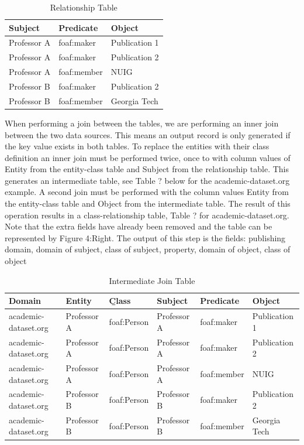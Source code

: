 \documentclass[11pt,onecolumn]{article}
\begin{document}
\begin{table}[h!]
\begin{center}
  \begin{tabular}{| l | l | l | }
    \hline
    {\bf Subject} & {\bf Predicate} & {\bf Object} \\ \hline    
    Professor A & foaf:maker & Publication 1  \\ \hline
    Professor A & foaf:maker & Publication 2  \\ \hline
    Professor A & foaf:member & NUIG  \\ \hline
    Professor B & foaf:maker & Publication 2  \\ \hline
    Professor B & foaf:member & Georgia Tech  \\ \hline
  \end{tabular}
\end{center}
\caption{Relationship Table}
\end{table}


When performing a join between the tables, we are performing an inner join between the two data sources.  This means an output record is only generated if the key value exists in both tables.  To replace the entities with their class definition an inner join must be performed twice, once to with column values of Entity from the entity-class table and Subject from the relationship table.  This generates an intermediate table, see Table ? below for the academic-dataset.org example.  A second join must be performed with the column values Entity from the entity-class table and Object from the intermediate table.  The result of this operation results in a class-relationship table, Table ? for academic-dataset.org.  Note that the extra fields have already been removed and the table can be represented by Figure 4:Right. The output of this step is the fields: publishing domain, domain of subject, class of subject, property, domain of object, class of object\\

\begin{table}[h!]
\begin{center}
  \begin{tabular}{| l | l | l | l | l | l | }
    \hline
    {\bf Domain} & {\bf Entity} & {\b Class} & {\bf Subject} & {\bf Predicate} & {\bf Object} \\ \hline    
    academic-dataset.org & Professor A & foaf:Person & Professor A & foaf:maker & Publication 1  \\ \hline
    academic-dataset.org & Professor A & foaf:Person & Professor A & foaf:maker & Publication 2  \\ \hline
    academic-dataset.org & Professor A & foaf:Person & Professor A & foaf:member & NUIG  \\ \hline
    academic-dataset.org & Professor B & foaf:Person & Professor B & foaf:maker & Publication 2  \\ \hline
    academic-dataset.org & Professor B & foaf:Person & Professor B & foaf:member & Georgia Tech  \\ \hline
  \end{tabular}
\end{center}
\caption{Intermediate Join Table}
\end{table}
\end{document}
